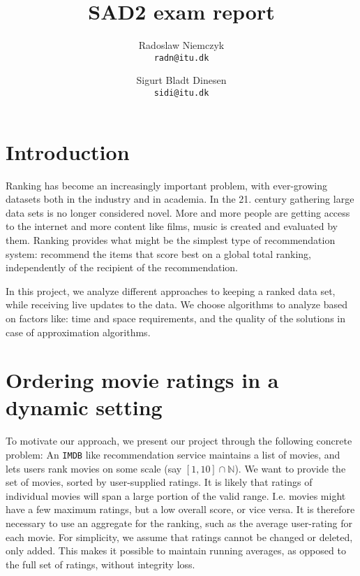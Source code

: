 \documentclass[a4paper, titlepage]{article}
\renewcommand{\%}{\scalebox{.9}{\oldpct}}
\begin{document}
\title{SAD2 exam report}
\author{
	Radoslaw Niemczyk
	\\\texttt{radn@itu.dk}
	\and
	Sigurt Bladt Dinesen
	\\\texttt{sidi@itu.dk}
}

\maketitle

\section{Introduction}
Ranking has become an increasingly important problem, with ever-growing datasets
both in the industry and in academia. In the 21. century gathering large data
sets is no longer considered novel. More and more people are getting access to
the internet and more content like films, music is created and evaluated by
them.
Ranking provides what might be the simplest type of recommendation system:
recommend the items that score best on a global total ranking, independently of
the recipient of the recommendation.

In this project, we analyze different approaches to keeping a ranked data set,
while receiving live updates to the data. We choose algorithms to analyze based
on factors like: time and space requirements, and the quality of the solutions
in case of approximation algorithms.

\section{Ordering movie ratings in a dynamic setting}
\label{sec:intro_real}
To motivate our approach, we present our project through the following concrete
problem: An \texttt{IMDB} like recommendation service maintains a list of
movies, and lets users rank movies on some scale (say $\left[1,10\right]\cap
\mathbb{N}$). We want to provide the set of movies, sorted by user-supplied
ratings. It is likely that ratings of individual movies will span a large
portion of the valid range. I.e. movies might have a few maximum ratings, but
a low overall score, or vice versa. It is therefore necessary to use an
aggregate for the ranking, such as the average user-rating for each movie. For
simplicity, we assume that ratings cannot be changed or deleted, only added.
This makes it possible to maintain running averages, as opposed to the full set
of ratings, without integrity loss.
\end{document}
